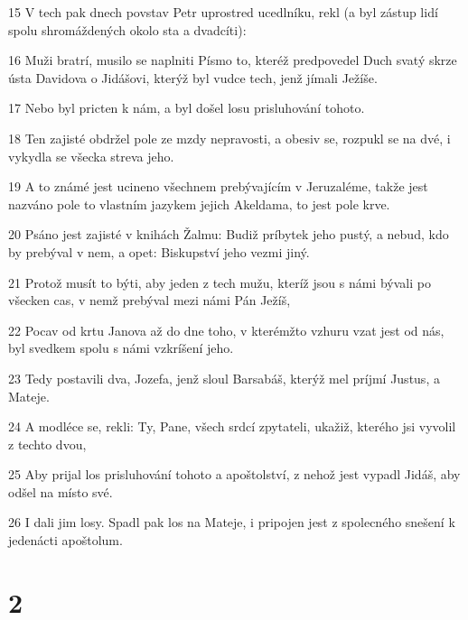 \par 15 V tech pak dnech povstav Petr uprostred ucedlníku, rekl (a byl zástup lidí spolu shromáždených okolo sta a dvadcíti):
\par 16 Muži bratrí, musilo se naplniti Písmo to, kteréž predpovedel Duch svatý skrze ústa Davidova o Jidášovi, kterýž byl vudce tech, jenž jímali Ježíše.
\par 17 Nebo byl pricten k nám, a byl došel losu prisluhování tohoto.
\par 18 Ten zajisté obdržel pole ze mzdy nepravosti, a obesiv se, rozpukl se na dvé, i vykydla se všecka streva jeho.
\par 19 A to známé jest ucineno všechnem prebývajícím v Jeruzaléme, takže jest nazváno pole to vlastním jazykem jejich Akeldama, to jest pole krve.
\par 20 Psáno jest zajisté v knihách Žalmu: Budiž príbytek jeho pustý, a nebud, kdo by prebýval v nem, a opet: Biskupství jeho vezmi jiný.
\par 21 Protož musít to býti, aby jeden z tech mužu, kteríž jsou s námi bývali po všecken cas, v nemž prebýval mezi námi Pán Ježíš,
\par 22 Pocav od krtu Janova až do dne toho, v kterémžto vzhuru vzat jest od nás, byl svedkem spolu s námi vzkríšení jeho.
\par 23 Tedy postavili dva, Jozefa, jenž sloul Barsabáš, kterýž mel príjmí Justus, a Mateje.
\par 24 A modléce se, rekli: Ty, Pane, všech srdcí zpytateli, ukažiž, kterého jsi vyvolil z techto dvou,
\par 25 Aby prijal los prisluhování tohoto a apoštolství, z nehož jest vypadl Jidáš, aby odšel na místo své.
\par 26 I dali jim losy. Spadl pak los na Mateje, i pripojen jest z spolecného snešení k jedenácti apoštolum.

\chapter{2}


